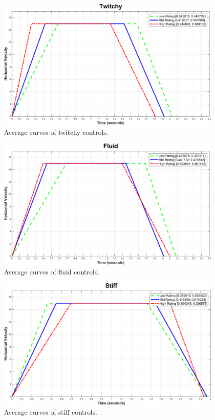 \begin{figure}[htbp]
\centering
\includegraphics[width=\columnwidth]{Pics/Curves/Twitchy_curve}
\caption{Average curves of twitchy controls.}
\label{fig:curve_twitchy}
\end{figure}

\begin{figure}[htbp]
\centering
\includegraphics[width=\columnwidth]{Pics/Curves/Fluid_curve}
\caption{Average curves of fluid controls.}
\label{fig:curve_fluid}
\end{figure}

\begin{figure}[htbp]
\centering
\includegraphics[width=\columnwidth]{Pics/Curves/Stiff_curve}
\caption{Average curves of stiff controls.}
\label{fig:curve_stiff}
\end{figure}


